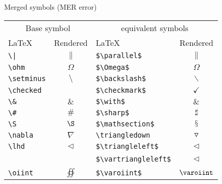 \begin{frame}[fragile]{Merged symbols (MER error)}
\begin{table}[ht]
    \centering
    \begin{tabular}{lc|lc}
        \toprule
        \multicolumn{2}{c}{Base symbol} & \multicolumn{2}{c}{equivalent symbols}\\
        \LaTeX         & Rendered       & \LaTeX                 & Rendered  \\\midrule
        \verb+\|+      & $\|$           & \verb+$\parallel$+     & $\parallel$\\
        \verb+\ohm+    & $\Omega$         & \verb+$\Omega$+      & $\Omega$\\
        \verb+\setminus+ & $\setminus$  & \verb+$\backslash$+    & $\backslash$\\
        \verb+\checked+ & {\mbox {\wasyfamily \char 8}} & \verb+$\checkmark$+    & $\checkmark$\\
        \verb+\&+      & $\&$           & \verb+$\with$+         & $\&$\\
        \verb+\#+      & $\#$           & \verb+$\sharp$+        & $\sharp$\\
        \verb+\S+      & $\S$           & \verb+$\mathsection$+  & $\mathsection$\\
        \verb+\nabla+  & $\nabla$       & \verb+\triangledown+   & $\triangledown$\\
        \verb+\lhd+    & $\lhd$         & \verb+$\triangleleft$+ & $\triangleleft$\\
        ~              & ~              & \verb+$\vartriangleleft$+ & $\vartriangleleft$\\
        \verb+\oiint+  & $\oiint$       & \verb+$\varoiint$+     & $\varoiint$\\
        \bottomrule
    \end{tabular}
\end{table}
\end{frame}



